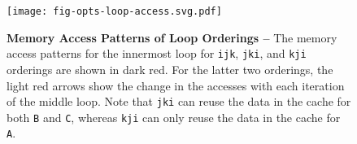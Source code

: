 
\begin{figure}[b]

  \centering
  \texttt{[image: fig-opts-loop-access.svg.pdf]}

  \caption{\textbf{Memory Access Patterns of Loop Orderings --} The
    memory access patterns for the innermost loop for {\tt{ijk}},
    {\tt{jki}}, and {\tt{kji}} orderings are shown in dark red. For the
    latter two orderings, the light red arrows show the change in the
    accesses with each iteration of the middle loop. Note that {\tt{jki}}
    can reuse the data in the cache for both {\tt{B}} and {\tt{C}},
    whereas {\tt{kji}} can only reuse the data in the cache for
    {\tt{A}}. }

  \label{fig-opts-loop-access}

\end{figure}
